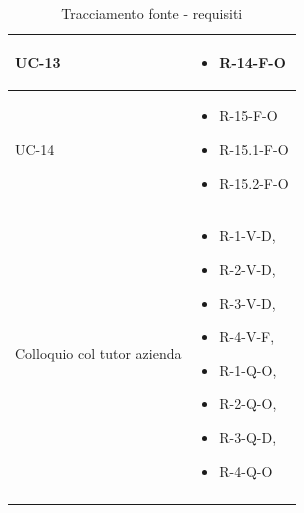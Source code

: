 \begin{center}
\begin{longtable}{| C{6cm} |C{6cm}|}
        UC-13 &
        \begin{itemize}
            \item R-14-F-O
        \end{itemize}\\\hline
        UC-14 &
        \begin{itemize}
            \item R-15-F-O
            \item R-15.1-F-O
            \item R-15.2-F-O
        \end{itemize}\\\hline
        Colloquio col tutor azienda &
        \begin{itemize}
            \item R-1-V-D,
            \item R-2-V-D,
            \item R-3-V-D,
            \item R-4-V-F,
            \item R-1-Q-O,
            \item R-2-Q-O,
            \item R-3-Q-D,
            \item R-4-Q-O
        \end{itemize} \\\hline
        \caption{Tracciamento fonte - requisiti}
    \end{longtable}
\end{center}

